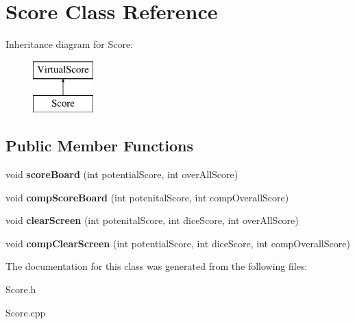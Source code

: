 \hypertarget{class_score}{\section{Score Class Reference}
\label{class_score}
}
Inheritance diagram for Score\+:\begin{figure}[H]
\begin{center}
\leavevmode
\includegraphics[height=2.000000cm]{class_score}
\end{center}
\end{figure}
\subsection*{Public Member Functions}
\begin{DoxyCompactItemize}
\item 
\hypertarget{class_score_a4cfb5cce9809de42f8bd08722705d674}{void {\bfseries score\+Board} (int potential\+Score, int over\+All\+Score)}\label{class_score_a4cfb5cce9809de42f8bd08722705d674}

\item 
\hypertarget{class_score_a8aa717c5b5dd793d256a2b78ae40573f}{void {\bfseries comp\+Score\+Board} (int potenital\+Score, int comp\+Overall\+Score)}\label{class_score_a8aa717c5b5dd793d256a2b78ae40573f}

\item 
\hypertarget{class_score_a28999bb14fa415da37c81bb7f7e102dc}{void {\bfseries clear\+Screen} (int potenital\+Score, int dice\+Score, int over\+All\+Score)}\label{class_score_a28999bb14fa415da37c81bb7f7e102dc}

\item 
\hypertarget{class_score_a4efe5d651d4a3a4db16423d0b4522180}{void {\bfseries comp\+Clear\+Screen} (int potential\+Score, int dice\+Score, int comp\+Overall\+Score)}\label{class_score_a4efe5d651d4a3a4db16423d0b4522180}

\end{DoxyCompactItemize}


The documentation for this class was generated from the following files\+:\begin{DoxyCompactItemize}
\item 
Score.\+h\item 
Score.\+cpp\end{DoxyCompactItemize}
